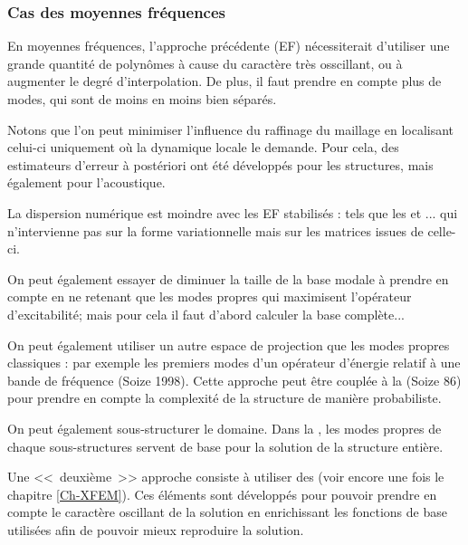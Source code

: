 \medskip
\subsubsection{Cas des moyennes fréquences}

En moyennes fréquences, l'approche précédente (EF) nécessiterait d'utiliser une grande quantité de polynômes 
à cause du caractère très osscillant, ou à augmenter le degré d'interpolation. De plus, il faut
prendre en compte plus de modes, qui sont de moins en moins bien séparés.

\medskip
Notons que l'on peut minimiser l'influence du raffinage du maillage en localisant celui-ci uniquement
où la dynamique locale le demande. Pour cela, des estimateurs d'erreur à postériori ont été
développés pour les structures, mais également pour l'acoustique.

La dispersion numérique est moindre avec les EF stabilisés :  tels que les  et ... 
qui n'intervienne pas sur la forme variationnelle mais sur les matrices issues de celle-ci.

\medskip
On peut également essayer de diminuer la taille de la base modale à prendre en compte en
ne retenant que les modes propres qui maximisent l'opérateur d'excitabilité; mais pour cela
il faut d'abord calculer la base complète...

On peut également utiliser un autre espace de projection que les modes propres classiques :
par exemple les premiers modes d'un opérateur d'énergie relatif à une bande de fréquence
(Soize 1998).
Cette approche peut être couplée à la  
(Soize 86)  pour prendre en compte la complexité de la structure de manière probabiliste.

\medskip
On peut également sous-structurer le domaine.
Dans la , les 
modes propres de chaque sous-structures  servent de base pour la solution 
de la structure entière.

\bigskip
Une <<~deuxième~>> approche consiste à utiliser des 
(voir encore une fois le chapitre \ref{Ch-XFEM}).
Ces éléments sont développés pour pouvoir prendre en compte le caractère
oscillant de la solution  en enrichissant les fonctions de base utilisées afin de pouvoir
mieux reproduire la solution.

